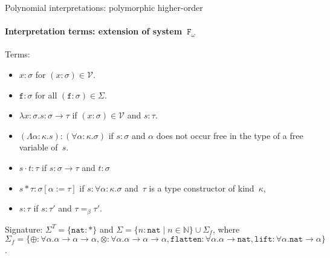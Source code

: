 \documentclass[10pt,presentation,color=names]{beamer}
\newcommand{\Fomega}{\mathtt{F}_\omega}
\newcommand{\Vars}{\mathcal{V}}
\newcommand{\arrtype}{\rightarrow}
\newcommand{\quant}[2]{\forall #1.#2}
\newcommand{\app}[2]{#1 \cdot #2}
\newcommand{\tapp}[2]{#1 * #2}
\newcommand{\subst}[2]{#1:=#2}
\newcommand{\abs}[2]{\lambda #1.#2}
\newcommand{\tabs}[2]{\Lambda #1.#2}
\newcommand{\nat}{\mathtt{nat}}
\newcommand{\flatten}{\mathtt{flatten}}
\newcommand{\lift}{\mathtt{lift}}
\newcommand{\Nbb}{\mathbb{N}}
\begin{document}
\begin{frame}{Polynomial interpretations: polymorphic higher-order}
  \framesubtitle{Interpretation terms: extension of system~$\Fomega$}
  Terms:
  \begin{itemize}
  \item $x : \sigma$ for $(x : \sigma) \in \Vars$.
  \item $\mathtt{f} : \sigma$ for all
    $(\mathtt{f} : \sigma) \in \Sigma$.
  \item $\abs{x:\sigma}{s} : \sigma \arrtype \tau$ if
    $(x : \sigma) \in \Vars$ and $s : \tau$.
  \item $(\tabs{\alpha:\kappa}{s}) : (\quant{\alpha:\kappa}{\sigma})$ if
    $s : \sigma$ and $\alpha$ does not occur free in the type of a
    free variable of~$s$.
  \item $\app{s}{t} : \tau$ if $s : \sigma \arrtype \tau$ and
    $t : \sigma$
  \item $\tapp{s}{\tau} : \sigma[\subst{\alpha}{\tau}]$ if
    $s : \quant{\alpha:\kappa}{\sigma}$ and~$\tau$ is a type
    constructor of kind~$\kappa$,
  \item $s : \tau$ if $s : \tau'$ and $\tau =_\beta \tau'$.
  \end{itemize}
  \pause
  Signature: $\Sigma^T = \{ \nat : * \}$ and $\Sigma = \{ n : \nat
  \mid n \in \Nbb \} \cup \Sigma_f$, where $\Sigma_f = \{ \oplus :
  \forall \alpha . \alpha \arrtype \alpha \arrtype \alpha, \otimes :
  \forall \alpha . \alpha \arrtype \alpha \arrtype \alpha, \flatten :
  \forall \alpha . \alpha \arrtype \nat, \lift : \forall \alpha . \nat
  \arrtype \alpha \}$.
\end{frame}
\end{document}
